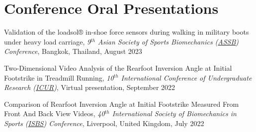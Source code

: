 \documentclass[../main.tex]{subfiles}
\begin{document}



\section{Conference Oral Presentations}
  \vspace{2pt}
    \resumeSubHeadingListStart
    \item
        \def\labelprefix{CP}
        \begin{etaremune}
            \item\label{conference_pre: assb2023} {Validation of the loadsol® in-shoe force sensors during walking in military boots under heavy load carriage, \textit{9$^{th}$ Asian Society of Sports Biomechanics (\href{http://www.assbweb.org/}{ASSB}) Conference}, Bangkok, Thailand, August 2023}
            
            \item\label{conference_pre: icur2022} {Two-Dimensional Video Analysis of the Rearfoot Inversion Angle at Initial Footstrike in Treadmill Running, \textit{10$^{th}$ International Conference of Undergraduate Research (\href{https://www.icurportal.com/}{ICUR})}, Virtual presentation, September 2022}
            
            \item\label{conference_pre: isbs2022} {Comparison of Rearfoot Inversion Angle at Initial Footstrike Measured From Front And Back View Videos, \textit{40$^{th}$ International Society of Biomechanics in Sports (\href{https://isbs.org/}{ISBS}) Conference}, Liverpool, United Kingdom, July 2022}
        \end{etaremune}
    \resumeSubHeadingListEnd
\end{document}
